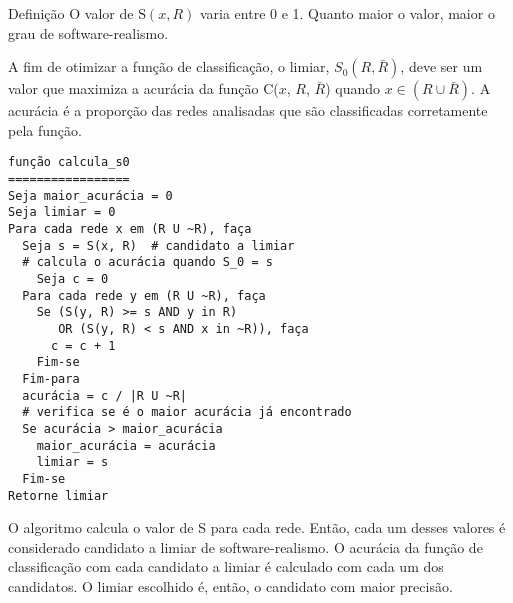 \begin{section}{Definição}
O valor de $\mathrm{S}(x, R)$ varia entre 0 e 1. Quanto maior o valor, maior o grau de software-realismo.

A fim de otimizar a função de classificação, o limiar, $S_0(R, \bar{R})$, deve ser um valor que maximiza a acurácia da função C($x$, $R$, $\bar{R}$) quando $x \in (R \cup \bar{R})$. A acurácia é a proporção das redes analisadas que são classificadas corretamente pela função.

\begin{verbatim}
função calcula_s0
=================
Seja maior_acurácia = 0
Seja limiar = 0
Para cada rede x em (R U ~R), faça
  Seja s = S(x, R)  # candidato a limiar
  # calcula o acurácia quando S_0 = s
	Seja c = 0
  Para cada rede y em (R U ~R), faça
    Se (S(y, R) >= s AND y in R)
       OR (S(y, R) < s AND x in ~R)), faça
      c = c + 1
    Fim-se
  Fim-para
  acurácia = c / |R U ~R|
  # verifica se é o maior acurácia já encontrado
  Se acurácia > maior_acurácia
    maior_acurácia = acurácia
    limiar = s
  Fim-se
Retorne limiar
\end{verbatim}

O algoritmo calcula o valor de S para cada rede. Então, cada um desses valores é considerado candidato a limiar de software-realismo. O acurácia da função de classificação com cada candidato a limiar é calculado com cada um dos candidatos. O limiar escolhido é, então, o candidato com maior precisão.

%


\end{section}


